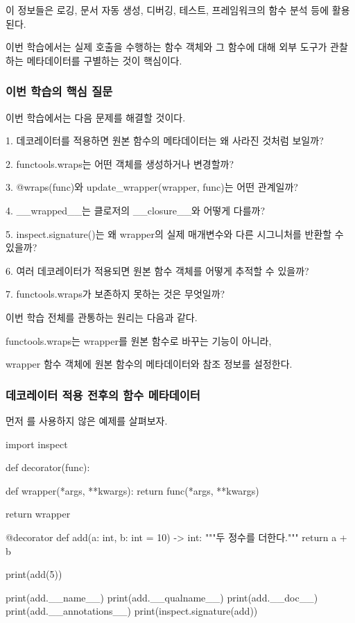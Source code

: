 이 정보들은 로깅, 문서 자동 생성, 디버깅, 테스트, 프레임워크의 함수 분석 등에 활용된다.

이번 학습에서는 실제 호출을 수행하는 함수 객체와 그 함수에 대해 외부 도구가 관찰하는 메타데이터를 구별하는 것이 핵심이다.

\subsubsection{이번 학습의 핵심 질문}

이번 학습에서는 다음 문제를 해결할 것이다.

\begin{dhksmry}
1. 데코레이터를 적용하면 원본 함수의 메타데이터는 왜 사라진 것처럼 
   보일까?

2. functools.wraps는 어떤 객체를 생성하거나 변경할까?

3. @wraps(func)와 update_wrapper(wrapper, func)는 
   어떤 관계일까?

4. __wrapped__는 클로저의 __closure__와 어떻게 다를까?

5. inspect.signature()는 왜 wrapper의 실제 매개변수와 
   다른 시그니처를 반환할 수 있을까?

6. 여러 데코레이터가 적용되면 원본 함수 객체를 어떻게 추적할 수 있을까?

7. functools.wraps가 보존하지 못하는 것은 무엇일까?
\end{dhksmry}

이번 학습 전체를 관통하는 원리는 다음과 같다.

\begin{dhksmry}[centered]
functools.wraps는 wrapper를 원본 함수로 바꾸는 기능이 아니라,

wrapper 함수 객체에 원본 함수의 메타데이터와 참조 정보를 설정한다.
\end{dhksmry}

\subsubsection{데코레이터 적용 전후의 함수 메타데이터}

먼저 를 사용하지 않은 예제를 살펴보자.

\begin{dhkcode}
import inspect


def decorator(func):

    def wrapper(*args, **kwargs):
        return func(*args, **kwargs)

    return wrapper


@decorator
def add(a: int, b: int = 10) -> int:
    """두 정수를 더한다."""
    return a + b


print(add(5))

print(add.__name__)
print(add.__qualname__)
print(add.__doc__)
print(add.__annotations__)
print(inspect.signature(add))
\end{dhkcode}

